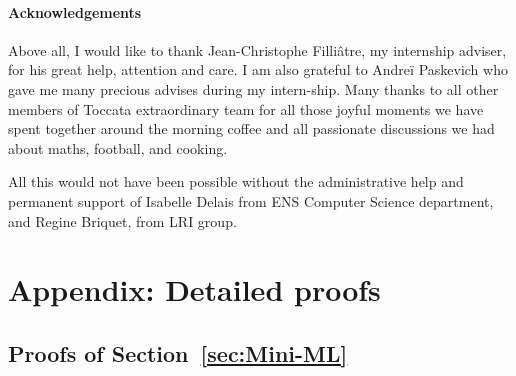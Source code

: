 \documentclass[a4paper,11pt,oneside]{article}
\theoremstyle{plain}
\begin{document}
\paragraph{Acknowledgements} Above all, I would like to thank
Jean-Christophe Filli\^atre,
my internship adviser, for his great help, attention and care.
I am also grateful to  Andre\"i Paskevich who gave me many precious advises during my intern-ship.
Many thanks to all other members of Toccata extraordinary team for all those joyful moments we have spent together around the morning coffee and all passionate discussions we had about maths, football, and cooking.

All this would not have been possible without the administrative help
and permanent support of Isabelle Delais from ENS Computer Science department,
and Regine Briquet, from LRI group.

\appendix
\newpage
\section{Appendix: Detailed proofs} 


\subsection{Proofs of Section~\ref{sec:Mini-ML}}
\end{document}

